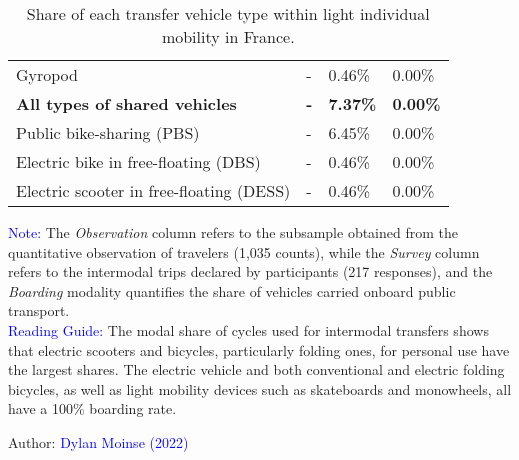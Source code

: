 \begin{table}[h!]
{\begin{tabular}{p{}p{}p{}p{}}
\small{Gyropod} & \small{-} & \small{0.46\%} & \small{0.00\%}\\
        \hdashline
\small{\textbf{All types of shared vehicles}} & \small{\textbf{-}} & \small{\textbf{7.37\%}} & \small{\textbf{0.00\%}}\\
\small{Public bike-sharing (\acrshort{PBS})} & \small{-} & \small{6.45\%} & \small{0.00\%}\\
\small{Electric bike in free-floating (\acrshort{DBS})} & \small{-} & \small{0.46\%} & \small{0.00\%}\\
\small{Electric scooter in free-floating (\acrshort{DESS})} & \multirow{1.5}{*}{\small{-}} & \multirow{1.5}{*}{\small{0.46\%}} & \multirow{1.5}{*}{\small{0.00\%}}\\
        \hline
        \end{tabular}}
    \caption{Share of each transfer vehicle type within light individual mobility in France.}
    \label{table-chap4:part-modale-vehicules-intermodalite}
        \vspace{5pt}
        \begin{flushleft}\scriptsize{
        \textcolor{blue}{Note:} The \textsl{Observation} column refers to the subsample obtained from the quantitative observation of travelers (1,035 counts), while the \textsl{Survey} column refers to the intermodal trips declared by participants (217 responses), and the \textsl{Boarding} modality quantifies the share of vehicles carried onboard public transport.
        \\
        \textcolor{blue}{Reading Guide:} The modal share of cycles used for intermodal transfers shows that electric scooters and bicycles, particularly folding ones, for personal use have the largest shares. The electric vehicle and both conventional and electric folding bicycles, as well as light mobility devices such as skateboards and monowheels, all have a 100\% boarding rate.
        }\end{flushleft}
        \begin{flushright}\scriptsize
        Author: \textcolor{blue}{Dylan Moinse (2022)}
        \end{flushright}
        \end{table}